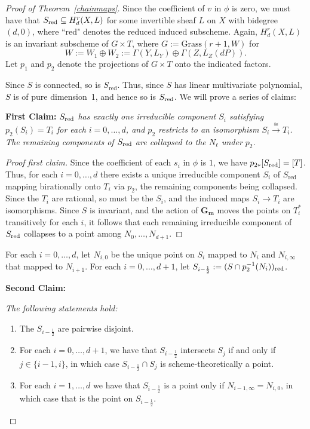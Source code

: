\documentclass[10pt,a4paper]{amsart}
\def\cc{{\mathbf G}_{\mathbf m}}
\def\red{\text{\rm red}}
\begin{document}
\begin{proof}[Proof of Theorem~\ref{chainmaps}] Since the coefficient of $v$ in $\phi$ is zero, we must have that 
$S_\red\subseteq H^r_d(X,L)$ for some invertible sheaf $L$ on $X$ with bidegree $(d,0)$, where ``red" denotes the reduced induced subscheme. Again, $H^r_d(X,L)$ is an invariant subscheme of $G\times T$, where $G:=\text{Grass}(r+1,W)$ for
$$
W:=W_1\oplus W_2:=\Gamma(Y,L_Y)\oplus\Gamma(Z,L_Z(dP)).
$$
Let $p_1$ and $p_2$ denote the projections of $G\times T$ onto the indicated factors.

Since $S$ is connected, so is $S_{\text{red}}$. Thus, since $S$ has linear multivariate polynomial, $S$ is of pure dimension~1, and hence so is $S_\red$. We will prove a series of claims:

\vskip0.2cm

{\bf First Claim:} {\it $S_{\text{\rm red}}$ has exactly one irreducible component $S_i$ satisfying $p_2(S_i)=T_i$ for each $i=0,\dots,d$, and $p_2$ restricts to an isomorphism $S_i\xrightarrow{\cong}T_i$. The remaining components of $S_{\text{\rm red}}$ are collapsed to the $N_\ell$ under $p_2$.}

\begin{proof}[Proof first claim] 
Since the coefficient of each $s_i$ in $\phi$ is $1$, 
we have $p_{2*}[S_\red]=[T]$. Thus, 
for each $i=0,\dots,d$ there exists a unique irreducible 
component $S_i$ of $S_{\text{red}}$
mapping birationally onto $T_i$ via $p_2$, the
remaining components being collapsed. Since the $T_i$ are rational, so must be the $S_i$, and the induced maps $S_i\to T_i$ are isomorphisms. 
Since $S$ is invariant, and the action of $\cc$ moves the points on
$T_i^*$ transitively for each $i$, it follows that each remaining
irreducible component of $S_\red$ collapses to a point among
$N_0,\dots,N_{d+1}$. 
\end{proof}

For each $i=0,\dots, d$, let $N_{i,0}$ be the unique point on $S_i$ mapped to $N_i$ and $N_{i,\infty}$ that mapped to $N_{i+1}$. For each $i=0,\dots,d+1$, let $S_{i-\frac{1}{2}}:=(S\cap p_2^{-1}(N_i))_\red$. 

\vskip0.2cm

{\bf Second Claim:} {\it The following statements hold:
\begin{enumerate}
\item The $S_{i-\frac{1}{2}}$ are pairwise disjoint.
\item For each $i=0,\dots,d+1$, we have that $S_{i-\frac{1}{2}}$ intersects $S_j$ if and only if $j\in\{i-1,i\}$, in which case $S_{i-\frac{1}{2}}\cap S_j$ is scheme-theoretically a point.
\item For each $i=1,\dots,d$ we have that $S_{i-\frac{1}{2}}$ is a point only if $N_{i-1,\infty}= N_{i,0}$, in which case that is the point on $S_{i-\frac{1}{2}}$.
\end{enumerate}
}


\end{proof}
\end{document}
